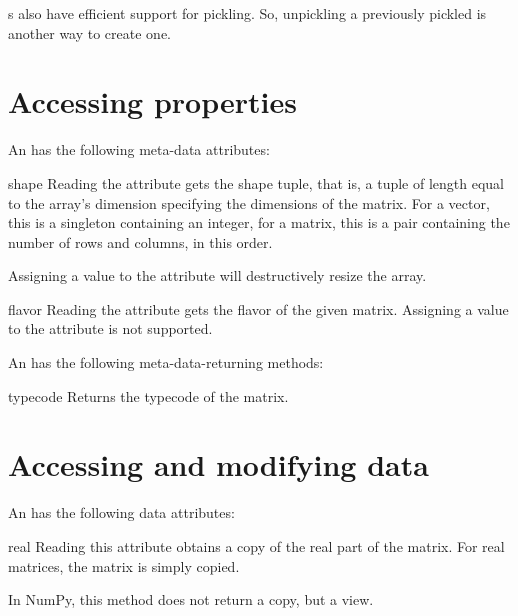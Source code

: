 s also have efficient support for pickling. So, unpickling
a previously pickled  is another way to create one.

\section{Accessing  properties}

\label{sec:arrayproperties}
An  has the following meta-data attributes:

\begin{memberdesc}[Array]{shape}
  Reading the  attribute gets the shape tuple, that is,
  a tuple of length equal to the array's dimension specifying the
  dimensions of the matrix.  For a vector, this is a singleton
  containing an integer, for a matrix, this is a pair containing the
  number of rows and columns, in this order.  

  Assigning a value to the  attribute will destructively
  resize the array.
\end{memberdesc}

\begin{memberdesc}[Array]{flavor}
  Reading the  attribute gets the flavor of the given
  matrix. Assigning a value to the  attribute is not supported.
\end{memberdesc}

An  has the following meta-data-returning methods:

\begin{methoddesc}[Array]{typecode}{}
  Returns the typecode of the matrix.
\end{methoddesc}

\section{Accessing and modifying  data}

An  has the following data attributes:

\begin{memberdesc}[Array]{real}
  Reading this attribute obtains a copy of the real part of the matrix.
  For real matrices, the matrix is simply copied.

  In NumPy, this method does not return a copy, but a view.
\end{memberdesc}

